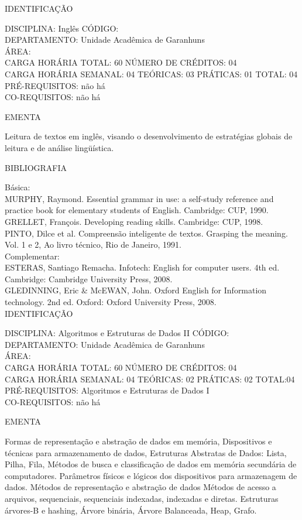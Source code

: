 \documentclass[
	12pt,				%
	openright,			%
  oneside,     %
	a4paper,			%
	chapter=TITLE,		%
	english,			%
	french,				%
	spanish,			%
	brazil				%
	]{abntex2}
\begin{document}
\begin{apendicesenv}
\newpage IDENTIFICAÇÃO

DISCIPLINA: Inglês CÓDIGO:\\ 
DEPARTAMENTO: Unidade Acadêmica de Garanhuns\\
ÁREA: \\
CARGA HORÁRIA TOTAL: 60 NÚMERO DE CRÉDITOS: 04\\
CARGA HORÁRIA SEMANAL: 04 TEÓRICAS: 03 PRÁTICAS: 01 TOTAL: 04\\
PRÉ-REQUISITOS: não há\\
CO-REQUISITOS: não há

EMENTA 

Leitura de textos em inglês, visando o desenvolvimento de estratégias
globais de leitura e de análise lingüística.

BIBLIOGRAFIA 

Básica:\\
MURPHY, Raymond. Essential grammar in use: a self-study reference and
practice book for elementary students of English. Cambridge: CUP, 1990.\\
GRELLET, François. Developing reading skills. Cambridge: CUP, 1998.\\
PINTO, Dilce et al. Compreensão inteligente de textos. Grasping the
meaning. Vol. 1 e 2, Ao livro técnico, Rio de Janeiro, 1991.\\
Complementar:\\
ESTERAS, Santiago Remacha. Infotech: English for computer users. 4th ed.
Cambridge: Cambridge University Press, 2008.\\
GLEDINNING, Eric \& McEWAN, John. Oxford English for Information
technology. 2nd ed. Oxford: Oxford University Press, 2008.\\


\newpage IDENTIFICAÇÃO

DISCIPLINA: Algoritmos e Estruturas de Dados II CÓDIGO:\\ 
DEPARTAMENTO: Unidade Acadêmica de Garanhuns\\
ÁREA: \\
CARGA HORÁRIA TOTAL: 60 NÚMERO DE CRÉDITOS: 04\\
CARGA HORÁRIA SEMANAL: 04 TEÓRICAS: 02 PRÁTICAS: 02 TOTAL:04\\
PRÉ-REQUISITOS: Algoritmos e Estruturas de Dados I\\
CO-REQUISITOS: não há

EMENTA 

Formas de representação e abstração de dados em memória, Dispositivos e técnicas para armazenamento de dados, Estruturas Abstratas de Dados:  Lista, Pilha, Fila, Métodos de busca e classificação de dados em memória secundária de computadores. Parâmetros físicos e lógicos dos dispositivos para armazenagem de dados. Métodos de representação e abstração de dados Métodos de acesso a arquivos, sequenciais, sequenciais indexadas,  indexadas e diretas. Estruturas árvores-B e  hashing, Árvore binária, Árvore Balanceada, Heap, Grafo.


\end{apendicesenv}
\end{document}
